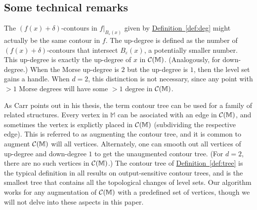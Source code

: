 \documentclass[11pt]{article}
\theoremstyle{definition}
\newcommand{\cC}{{\cal C}}
\newcommand{\MM}{\mathbb{M}}
\newcommand{\eps}{\varepsilon}
\newcommand{\Def}[1]{\hyperref[def:#1]{Definition~\ref*{def:#1}}} %
\newcommand{\reeb}{\cC}
\begin{document}
\subsection{Some technical remarks}

The $(f(x)+\delta)$-contours in $f|_{B_\eps(x)}$ given by \Def{deg} might actually be the same
contour in $f$. The up-degree is defined as the number of $(f(x)+\delta)$-contours
that intersect $B_\eps(x)$, a potentially smaller number. This up-degree
is exactly the up-degree of $x$ in $\reeb(\MM)$. (Analogously, for down-degree.)
When the Morse up-degree is $2$ but the up-degree is $1$, then the level set gains a handle.
When $d=2$, this distinction is not necessary, since any point with $>1$
Morse degrees will have some $>1$ degree in $\reeb(\MM)$.

As Carr points out in his thesis, the term contour tree can be used for a family of related structures.
Every vertex in $\MM$ can be asociated with an edge in $\reeb(\MM)$, and sometimes the
vertex is explictly placed in $\reeb(\MM)$ (subdividing the respective edge). This is referred
to as augmenting the contour tree, and it is common to augment $\reeb(\MM)$ will all vertices.
Alternately, one can smooth out all vertices of up-degree and down-degree $1$ to get the
unaugmented contour tree. (For $d=2$, there are no such vertices in $\reeb(\MM)$.) 
The contour tree of \Def{tree} is the typical definition in all results on output-sensitive
contour trees, and is the smallest tree that contains all the topological changes
of level sets. Our algorithm works for any augmentation of $\reeb(\MM)$ with a predefined
set of vertices, though we will not delve into these aspects in this paper.
\end{document}
